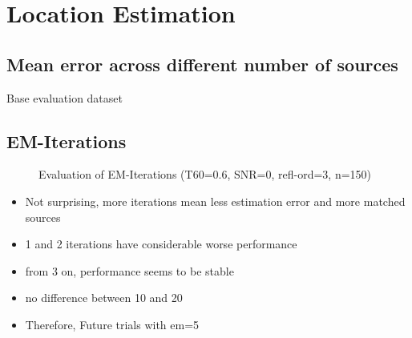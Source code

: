 \section{Location Estimation}
\subsection*{Mean error across different number of sources}

%		
%
\begin{table}[H]
	\centering
	
	\caption{Base evaluation dataset}
\end{table}

\setcounter{topnumber}{2}
\setcounter{bottomnumber}{2}
\setcounter{totalnumber}{4}
\renewcommand{\topfraction}{0.85}
\renewcommand{\bottomfraction}{0.85}
\renewcommand{\textfraction}{0.15}
\renewcommand{\floatpagefraction}{0.8}
\renewcommand{\textfraction}{0.1}
\setlength{\floatsep}{5pt plus 2pt minus 2pt}
\setlength{\textfloatsep}{5pt plus 2pt minus 2pt}
\setlength{\intextsep}{5pt plus 2pt minus 2pt}

\subsection*{EM-Iterations}
\begin{figure}[!htp]
    \centering
    \begin{subfigure}{0.49\textwidth}
          \centering
	       
%            
	\end{subfigure}
    \begin{subfigure}{0.49\textwidth}
          \centering
	       
%            
	\end{subfigure}
\caption{Evaluation of EM-Iterations (T60=0.6, SNR=0, refl-ord=3, n=150)}
\end{figure}

\begin{itemize}
\item Not surprising, more iterations mean less estimation error and more matched sources
\item 1 and 2 iterations have considerable worse performance
\item from 3 on, performance seems to be stable
\item no difference between 10 and 20
\item Therefore, Future trials with em=5
\end{itemize}

